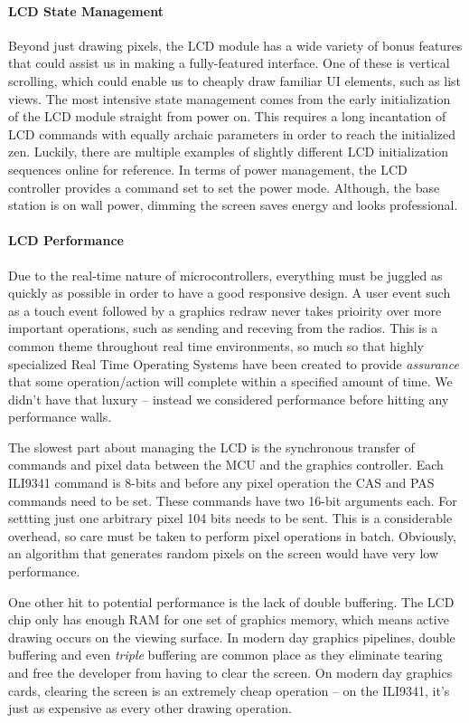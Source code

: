 \paragraph{LCD State Management}
Beyond just drawing pixels, the LCD module has a wide variety of bonus features
that could assist us in making a fully-featured interface. One of these is
vertical scrolling, which could enable us to cheaply draw familiar UI elements,
such as list views. The most intensive state management comes from the early
initialization of the LCD module straight from power on. This requires a long
incantation of LCD commands with equally archaic parameters in order to reach
the initialized zen. Luckily, there are multiple examples of slightly different
LCD initialization sequences online for reference. In terms of power
management, the LCD controller provides a command set to set the power mode.
Although, the base station is on wall power, dimming the screen
saves energy and looks professional.

\paragraph{LCD Performance}
\label{par:lcd-perf}
Due to the real-time nature of microcontrollers, everything must be juggled as
quickly as possible in order to have a good responsive design. A user event
such as a touch event followed by a graphics redraw never takes prioirity
over more important operations, such as sending and receving from the radios.
This is a common theme
throughout real time environments, so much so that highly specialized Real Time
Operating Systems have been created to provide \emph{assurance} that some
operation/action will complete within a specified amount of time. We didn't have that luxury -- instead we considered performance before hitting any performance walls.

The slowest part about managing the LCD is the synchronous transfer of
commands and pixel data between the MCU and the graphics controller. Each
ILI9341 command is 8-bits and before any pixel operation the CAS and PAS
commands need to be set. These commands have two 16-bit arguments each.
For settting just one arbitrary pixel 104 bits needs to be sent. This is a
considerable overhead, so care must be taken to perform pixel operations in
batch. Obviously, an algorithm that generates random pixels on the screen would have very
low performance.

One other hit to potential performance is the lack of double buffering. The LCD
chip only has enough RAM for one set of graphics memory, which means active
drawing occurs on the viewing surface. In modern day graphics pipelines, double
buffering and even \emph{triple} buffering are common place as they eliminate
tearing and free the developer from having to clear the screen. On modern day
graphics cards, clearing the screen is an extremely cheap operation -- on the
ILI9341, it's just as expensive as every other drawing operation.

